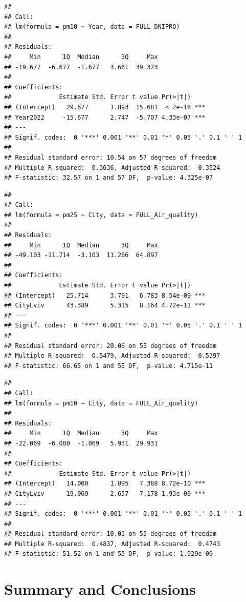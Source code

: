 \documentclass[
  12pt,
]{article}
\begin{document}
\begin{verbatim}
## 
## Call:
## lm(formula = pm10 ~ Year, data = FULL_DNIPRO)
## 
## Residuals:
##     Min      1Q  Median      3Q     Max 
## -19.677  -6.677  -1.677   3.661  39.323 
## 
## Coefficients:
##             Estimate Std. Error t value Pr(>|t|)    
## (Intercept)   29.677      1.893  15.681  < 2e-16 ***
## Year2022     -15.677      2.747  -5.707 4.33e-07 ***
## ---
## Signif. codes:  0 '***' 0.001 '**' 0.01 '*' 0.05 '.' 0.1 ' ' 1
## 
## Residual standard error: 10.54 on 57 degrees of freedom
## Multiple R-squared:  0.3636, Adjusted R-squared:  0.3524 
## F-statistic: 32.57 on 1 and 57 DF,  p-value: 4.325e-07
\end{verbatim}

\begin{verbatim}
## 
## Call:
## lm(formula = pm25 ~ City, data = FULL_Air_quality)
## 
## Residuals:
##     Min      1Q  Median      3Q     Max 
## -49.103 -11.714  -3.103  11.286  64.897 
## 
## Coefficients:
##             Estimate Std. Error t value Pr(>|t|)    
## (Intercept)   25.714      3.791   6.783 8.54e-09 ***
## CityLviv      43.389      5.315   8.164 4.72e-11 ***
## ---
## Signif. codes:  0 '***' 0.001 '**' 0.01 '*' 0.05 '.' 0.1 ' ' 1
## 
## Residual standard error: 20.06 on 55 degrees of freedom
## Multiple R-squared:  0.5479, Adjusted R-squared:  0.5397 
## F-statistic: 66.65 on 1 and 55 DF,  p-value: 4.715e-11
\end{verbatim}

\begin{verbatim}
## 
## Call:
## lm(formula = pm10 ~ City, data = FULL_Air_quality)
## 
## Residuals:
##     Min      1Q  Median      3Q     Max 
## -22.069  -6.000  -1.069   5.931  29.931 
## 
## Coefficients:
##             Estimate Std. Error t value Pr(>|t|)    
## (Intercept)   14.000      1.895   7.388 8.72e-10 ***
## CityLviv      19.069      2.657   7.178 1.93e-09 ***
## ---
## Signif. codes:  0 '***' 0.001 '**' 0.01 '*' 0.05 '.' 0.1 ' ' 1
## 
## Residual standard error: 10.03 on 55 degrees of freedom
## Multiple R-squared:  0.4837, Adjusted R-squared:  0.4743 
## F-statistic: 51.52 on 1 and 55 DF,  p-value: 1.929e-09
\end{verbatim}

\newpage

\hypertarget{summary-and-conclusions}{%
\section{Summary and Conclusions}\label{summary-and-conclusions}}
\end{document}

